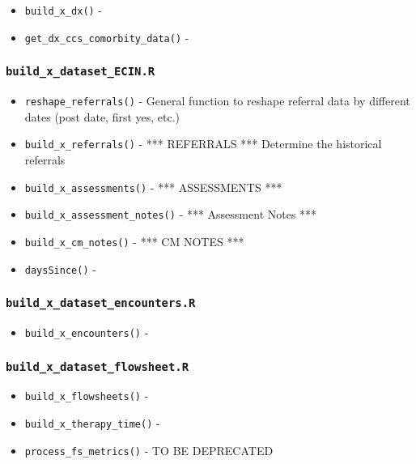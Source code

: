 \documentclass[
]{book}
\providecommand{\tightlist}{%
  \setlength{\itemsep}{0pt}\setlength{\parskip}{0pt}}
\begin{document}
\begin{itemize}
\tightlist
\item
  \texttt{build\_x\_dx()} -
\item
  \texttt{get\_dx\_ccs\_comorbity\_data()} -
\end{itemize}

\hypertarget{build_x_dataset_ecin.r}{%
\subsubsection{\texorpdfstring{\texttt{build\_x\_dataset\_ECIN.R}}{build\_x\_dataset\_ECIN.R}}\label{build_x_dataset_ecin.r}}

\begin{itemize}
\tightlist
\item
  \texttt{reshape\_referrals()} - General function to reshape referral data by different dates (post date, first yes, etc.)
\item
  \texttt{build\_x\_referrals()} - *** REFERRALS *** Determine the historical referrals
\item
  \texttt{build\_x\_assessments()} - *** ASSESSMENTS ***
\item
  \texttt{build\_x\_assessment\_notes()} - *** Assessment Notes ***
\item
  \texttt{build\_x\_cm\_notes()} - *** CM NOTES ***
\item
  \texttt{daysSince()} -
\end{itemize}

\hypertarget{build_x_dataset_encounters.r}{%
\subsubsection{\texorpdfstring{\texttt{build\_x\_dataset\_encounters.R}}{build\_x\_dataset\_encounters.R}}\label{build_x_dataset_encounters.r}}

\begin{itemize}
\tightlist
\item
  \texttt{build\_x\_encounters()} -
\end{itemize}

\hypertarget{build_x_dataset_flowsheet.r}{%
\subsubsection{\texorpdfstring{\texttt{build\_x\_dataset\_flowsheet.R}}{build\_x\_dataset\_flowsheet.R}}\label{build_x_dataset_flowsheet.r}}

\begin{itemize}
\tightlist
\item
  \texttt{build\_x\_flowsheets()} -
\item
  \texttt{build\_x\_therapy\_time()} -
\item
  \texttt{process\_fs\_metrics()} - TO BE DEPRECATED
\end{itemize}
\end{document}
